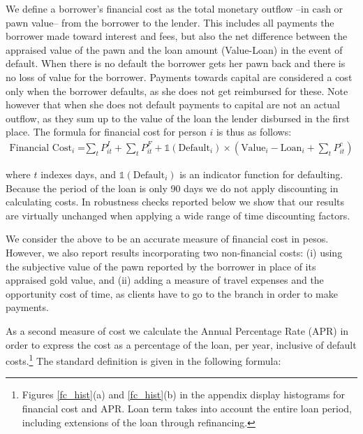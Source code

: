 \documentclass[11pt, a4paper]{article}
\begin{document}
We define a borrower's financial cost as the total monetary outflow --in cash or pawn value-- from the borrower to the lender. This includes all payments the borrower made toward interest and fees, but also the net difference between the appraised value of the pawn and the loan amount (Value-Loan) in the event of default. When there is no default the borrower gets her pawn back and there is no loss of value for the borrower. Payments towards capital are considered a cost only when the borrower defaults, as she does not get reimbursed for these. Note however that when she does not default payments to capital are not an actual outflow, as they sum up to the value of the loan the lender disbursed in the first place. The formula for financial cost for person $i$ is thus as follows: %
\begin{align*}
    \text{Financial Cost}_i =&  \sum_t P^I_{it} +\sum_t P^F_{it}  
     + \mathds{1}(\text{Default}_i) \times (\text{Value}_i-\text{Loan}_i + \sum_t P^c_{it})
\end{align*}

\noindent where $t$ indexes days, and $\mathds{1}(\text{Default}_i)$ is an indicator function for defaulting. Because the period of the loan is only 90 days we do not apply discounting in calculating costs.  In robustness checks reported below we show that our results are virtually unchanged when applying a wide range of time discounting factors.

We consider the above to be an accurate measure of financial cost in pesos. However, we also report results incorporating two non-financial costs: (i) using the subjective value of the pawn reported by the borrower in place of its appraised gold value, and (ii) adding a measure of travel expenses and the opportunity cost of time, as clients have to go to the branch in order to make payments.

As a second measure of cost we calculate the Annual Percentage Rate (APR) in order to express the cost as a percentage of the loan, per year, inclusive of default costs.\footnote{Figures \ref{fc_hist}(a) and \ref{fc_hist}(b)  in the appendix display histograms for financial cost and APR. Loan term takes into account the entire loan period, including extensions of the loan through refinancing.} The standard definition is given in the following formula:
\end{document}
